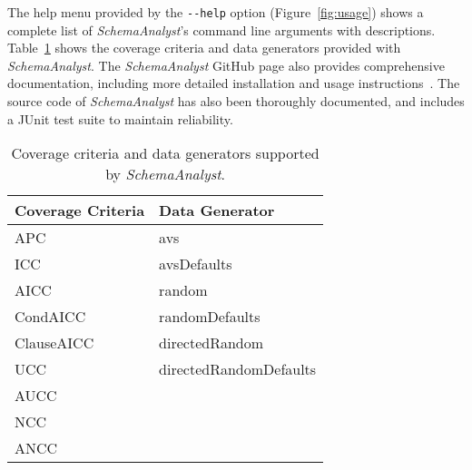 The help menu provided by the \lstinline{--help} option (Figure~\ref{fig:usage}) shows a complete list of \textit{SchemaAnalyst}'s
command line arguments with descriptions. Table~\ref{tab:args} shows the coverage criteria and data generators
provided with \textit{SchemaAnalyst}. The \textit{SchemaAnalyst} GitHub page also provides comprehensive
documentation, including more detailed installation and usage instructions~\cite{tool}. The source code of
\textit{SchemaAnalyst} has also been thoroughly documented, and 
includes a JUnit test suite to maintain reliability.

\begin{table}[]
\centering
\caption{Coverage criteria and data generators supported by \textit{SchemaAnalyst}.}
\label{tab:args}
\begin{tabular}{l|l}
\multicolumn{1}{c|}{Coverage Criteria} & Data Generator         \\ \hline
APC                                    & avs                    \\
ICC                                    & avsDefaults            \\
AICC                                   & random                 \\
CondAICC                               & randomDefaults         \\
ClauseAICC                             & directedRandom         \\
UCC                                    & directedRandomDefaults \\
AUCC                                   &                        \\
NCC                                    &                        \\
ANCC                                   &                       
\end{tabular}
\end{table}
